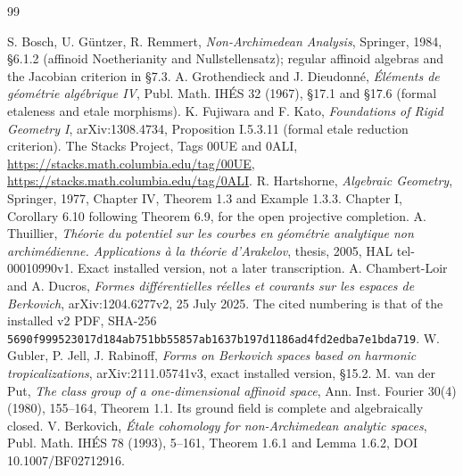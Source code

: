 \documentclass[11pt]{article}
\begin{document}
\begin{thebibliography}{99}
\raggedright
{} S. Bosch, U. G\"untzer, R. Remmert,
\emph{Non-Archimedean Analysis}, Springer, 1984, \S6.1.2
(affinoid Noetherianity and Nullstellensatz); regular affinoid
algebras and the Jacobian criterion in \S7.3.
 A. Grothendieck and J. Dieudonn\'e,
\emph{\'El\'ements de g\'eom\'etrie alg\'ebrique IV},
Publ. Math. IH\'ES 32 (1967), \S17.1 and \S17.6
(formal etaleness and etale morphisms).
 K. Fujiwara and F. Kato,
\emph{Foundations of Rigid Geometry I}, arXiv:1308.4734,
Proposition I.5.3.11 (formal etale reduction criterion).
 The Stacks Project, Tags 00UE and 0ALI,
\url{https://stacks.math.columbia.edu/tag/00UE},
\url{https://stacks.math.columbia.edu/tag/0ALI}.
 R. Hartshorne, \emph{Algebraic Geometry},
Springer, 1977, Chapter IV, Theorem 1.3 and Example 1.3.3.
Chapter I, Corollary 6.10 following Theorem 6.9, for the open projective completion.
 A. Thuillier, \emph{Th\'eorie du potentiel sur
les courbes en g\'eom\'etrie analytique non archim\'edienne.
Applications \`a la th\'eorie d'Arakelov}, thesis, 2005,
HAL tel-00010990v1. Exact installed version, not a later
transcription.
 A. Chambert-Loir and A. Ducros,
\emph{Formes diff\'erentielles r\'eelles et courants sur les
espaces de Berkovich}, arXiv:1204.6277v2, 25 July 2025.
The cited numbering is that of the installed v2 PDF, SHA-256
\nolinkurl{5690f999523017d184ab751bb55857ab1637b197d1186ad4fd2edba7e1bda719}.
 W. Gubler, P. Jell, J. Rabinoff,
\emph{Forms on Berkovich spaces based on harmonic tropicalizations},
arXiv:2111.05741v3, exact installed version, \S15.2.
 M. van der Put, \emph{The class group of a
one-dimensional affinoid space}, Ann. Inst. Fourier 30(4) (1980),
155--164, Theorem 1.1. Its ground field is complete and
algebraically closed.
 V. Berkovich, \emph{\'Etale cohomology for
non-Archimedean analytic spaces}, Publ. Math. IH\'ES 78 (1993),
5--161, Theorem 1.6.1 and Lemma 1.6.2,
DOI 10.1007/BF02712916.
\end{thebibliography}
\end{document}
